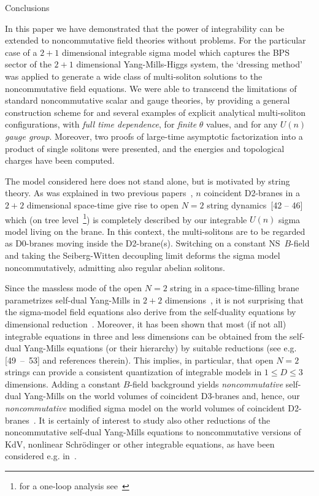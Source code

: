 \documentclass[a4paper,11pt]{article}
\makeatletter
\renewcommand{\section}{\@startsection{section}{1}{0pt}{\medskipamount}
{\medskipamount}{\large\bf}}
\numberwithin{equation}{section}
\def\th{\theta}
\makeatother
\begin{document}
\section{Conclusions}

\noindent
In this paper we have demonstrated that the power of integrability can
be extended to noncommutative field theories without problems.
For the particular case of a $2{+}1$ dimensional integrable sigma model
which captures the BPS sector of the $2{+}1$ dimensional Yang-Mills-Higgs
system, the `dressing method' was applied to generate a wide class
of multi-soliton solutions to the noncommutative field equations.
We were able to transcend the limitations of standard noncommutative
scalar and gauge theories, by providing a general construction scheme for
and several examples of explicit analytical multi-soliton configurations,
with {\it full time dependence\/}, for {\it finite\/} $\th$ values, and
for any $U(n)$ {\it gauge group\/}. Moreover, two proofs of large-time
asymptotic factorization into a product of single solitons were presented,
and the energies and topological charges have been computed.

The model considered here does not stand alone, but is motivated
by string theory. As was explained in two previous papers~\cite{LPS1,LPS2},
$n$ coincident D2-branes in a $2{+}2$ dimensional space-time give rise to
open $N{=}2$ string dynamics~[42 -- 46] which (on tree level~\footnote{
for a one-loop analysis see~\cite{CLN,CS} }) is completely described
by our integrable $U(n)$ sigma model living on the brane. In this context, the
multi-solitons are to be regarded as D0-branes moving inside the D2-brane(s).
Switching on a constant NS~$B$-field and taking the Seiberg-Witten decoupling
limit deforms the sigma model noncommutatively, admitting also regular
abelian solitons.

Since the massless mode of the open $N{=}2$ string in a space-time-filling
brane parametrizes self-dual Yang-Mills in $2{+}2$ dimensions~\cite{OV},
it is not surprising that the sigma-model field equations also derive from the
self-duality equations by dimensional reduction~\cite{ward}.
Moreover, it has been shown that most (if not all) integrable equations in
three and less dimensions can be obtained from the self-dual Yang-Mills
equations (or their hierarchy) by suitable reductions
(see e.g. \mbox{[49 -- 53]} and references therein).
This implies, in particular, that open $N{=}2$ strings can provide a
consistent quantization of integrable models in $1{\le}D{\le}3$ dimensions.
Adding a constant $B$-field background yields {\it noncommutative\/} self-dual
Yang-Mills on the world volumes of coincident D3-branes and, hence,
our {\it noncommutative\/} modified sigma model on the world volumes of
coincident D2-branes~\cite{LPS1}.
It is certainly of interest to study also other reductions of the
noncommutative self-dual Yang-Mills equations to noncommutative versions of
KdV, nonlinear Schr\"odinger or other integrable equations, as have been
considered e.g. in~\cite{taka,legare,dimakis,paniak}.
\end{document}
